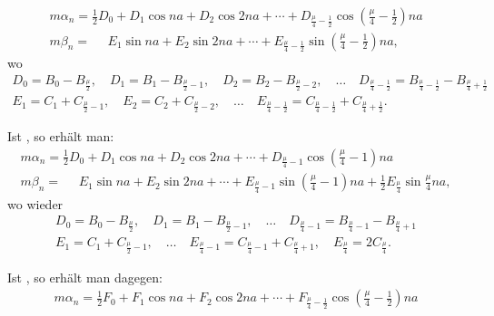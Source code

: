 \begin{landscape}
\[
\tag*{1)}
\begin{array}{l}
m\alpha_n = \tfrac{1}{2}D_0 + D_1\cos na + D_2\cos 2na + \cdots + D_{\frac{\mu}{4}-\frac{1}{2}}\cos\left(\frac{\mu}{4}-\frac{1}{2}\right)na \\[4pt]
m\beta_n = \phantom{{}={}} E_1\sin na + E_2\sin 2na + \cdots + E_{\frac{\mu}{4}-\frac{1}{2}}\sin\left(\frac{\mu}{4}-\frac{1}{2}\right)na,
\end{array}
\]
wo
\[
\begin{gathered}
D_0 = B_0 - B_{\frac{\mu}{2}}, \quad D_1 = B_1 - B_{\frac{\mu}{2}-1}, \quad D_2 = B_2 - B_{\frac{\mu}{2}-2}, \quad \ldots \quad D_{\frac{\mu}{4}-\frac{1}{2}} = B_{\frac{\mu}{4}-\frac{1}{2}} - B_{\frac{\mu}{4}+\frac{1}{2}}\\[4pt]
E_1 = C_1 + C_{\frac{\mu}{2}-1}, \quad E_2 = C_2 + C_{\frac{\mu}{2}-2}, \quad \ldots \quad E_{\frac{\mu}{4}-\frac{1}{2}} = C_{\frac{\mu}{4}-\frac{1}{2}} + C_{\frac{\mu}{4}+\frac{1}{2}}.
\end{gathered}
\]
\par\noindent\hspace*{\parindent}Ist , so erhält man:
\[
\tag*{2)}
\begin{array}{l}
m\alpha_n = \tfrac{1}{2}D_0 + D_1\cos na + D_2\cos 2na + \cdots + D_{\frac{\mu}{4}-1}\cos\left(\frac{\mu}{4}-1\right)na \\[4pt]
m\beta_n = \phantom{{}={}} E_1\sin na + E_2\sin 2na + \cdots + E_{\frac{\mu}{4}-1}\sin\left(\frac{\mu}{4}-1\right)na + \tfrac{1}{2}E_{\frac{\mu}{4}}\sin\frac{\mu}{4}na,
\end{array}
\]
wo wieder
\[
\begin{gathered}
D_0 = B_0 - B_{\frac{\mu}{2}}, \quad D_1 = B_1 - B_{\frac{\mu}{2}-1}, \quad \ldots \quad D_{\frac{\mu}{4}-1} = B_{\frac{\mu}{4}-1} - B_{\frac{\mu}{4}+1}\\[4pt]
E_1 = C_1 + C_{\frac{\mu}{2}-1}, \quad \ldots \quad E_{\frac{\mu}{4}-1} = C_{\frac{\mu}{4}-1} + C_{\frac{\mu}{4}+1}, \quad E_{\frac{\mu}{4}} = 2C_{\frac{\mu}{4}}.
\end{gathered}
\]
\par\noindent\hspace*{\parindent}Ist , so erhält man dagegen:
\[
\tag*{3)}
\begin{array}{l}
m\alpha_n = \tfrac{1}{2}F_0 + F_1\cos na + F_2\cos 2na + \cdots + F_{\frac{\mu}{4}-\frac{1}{2}}\cos\left(\frac{\mu}{4}-\frac{1}{2}\right)na \\[4pt]

\end{array}\]
\end{landscape}

